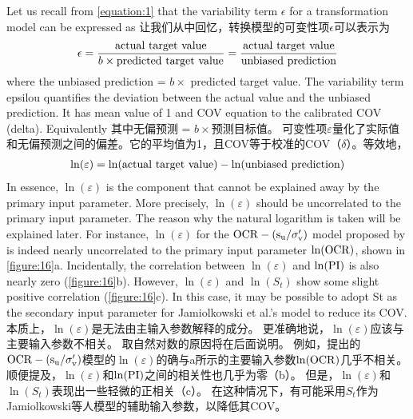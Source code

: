 
\begin{Parallel}{0.60\textwidth}{}
    \ParallelLText
    {
        Let us recall from \autoref{equation:1} that the variability term $\epsilon$ for a  transformation model can be expressed as
    }
    \ParallelRText
    {
        让我们从中回忆，转换模型的可变性项$\epsilon$可以表示为
    }
    \ParallelPar
    \begin{align}
        \epsilon=\dfrac{\rm{actual~target~value}}{b\times{}\rm{predicted~target~value}}=\dfrac{\rm{actual~target~value}}{\rm{unbiased~prediction}}
        \label{equation:2}
    \end{align}
    \ParallelLText
    {
        where the unbiased prediction = $b\times$ predicted target value. The variability term epsilou quantifies the deviation between the actual value and the unbiased prediction. It has mean value of 1 and COV equation to the calibrated COV (delta). Equivalently
    }
    \ParallelRText
    {
        其中无偏预测 = $b\times$预测目标值。 可变性项$\varepsilon$量化了实际值和无偏预测之间的偏差。它的平均值为1，且COV等于校准的COV（$\delta$）。等效地，
    }
    \ParallelPar
    \begin{align}
        \ln(\varepsilon)=\ln(\rm{actual~target~value})-\ln({\rm{unbiased~prediction}})
        \label{equation:3}
    \end{align}
    \ParallelLText
    {
        In essence, $\ln(\varepsilon)$ is the component that cannot be explained away by the primary input parameter. More precisely, $\ln(\varepsilon)$ should be uncorrelated to the primary input parameter. The reason why the natural logarithm is taken will be explained later. For instance, $\ln(\varepsilon)$ for the $\rm{OCR}-(s_u/\sigma_v')$ model proposed by \citet{Jamiolkowski198557} is indeed nearly uncorrelated to the primary input parameter $\ln(\rm{OCR})$, shown in \autoref{figure:16}a. Incidentally, the correlation between $\ln(\varepsilon)$ and $\ln(\rm{PI})$ is also nearly zero (\autoref{figure:16}b). However, $\ln(\varepsilon)$ and $\ln(S_t)$ show some slight positive correlation (\autoref{figure:16}c). In this case, it may be possible to adopt St as the secondary input parameter for Jamiolkowski et al.’s model to reduce its COV.
    }
    \ParallelRText
    {
        本质上，$\ln(\varepsilon)$是无法由主输入参数解释的成分。 更准确地说，$\ln(\varepsilon)$应该与主要输入参数不相关。 取自然对数的原因将在后面说明。 例如，\citet{Jamiolkowski198557}提出的$\rm{OCR}-(s_u/\sigma_v')$模型的$\ln(\varepsilon)$的确与a所示的主要输入参数$\ln(\rm{OCR})$几乎不相关。 顺便提及，$\ln(\varepsilon)$和$\ln(\rm{PI})$之间的相关性也几乎为零（b）。 但是，$\ln(\varepsilon)$和$\ln(S_t)$表现出一些轻微的正相关（c）。 在这种情况下，有可能采用$S_t$作为Jamiolkowski等人模型的辅助输入参数，以降低其COV。
}
\end{Parallel}
